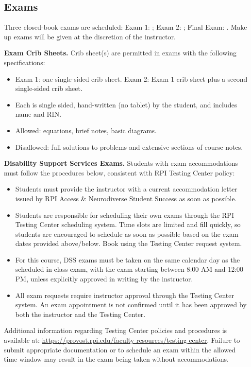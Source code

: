 \subsection*{Exams}
Three closed-book exams are scheduled: Exam 1: \ExamOneDate{}; Exam 2: \ExamTwoDate{}; Final Exam: \FinalExamStatus{}. Make up exams will be given at the discretion of the instructor.

\textbf{Exam Crib Sheets.} Crib sheet(s) are permitted in exams with the following specifications:
\begin{itemize}
\item Exam 1: one single-sided crib sheet. Exam 2: Exam 1 crib sheet plus a second single-sided crib sheet.
\item Each is single sided, hand-written (no tablet) by the student, and includes name and RIN.
\item Allowed: equations, brief notes, basic diagrams.
\item Disallowed: full solutions to problems and extensive sections of course notes.
\end{itemize}

\textbf{Disability Support Services Exams.} Students with exam accommodations must follow the procedures below, consistent with RPI Testing Center policy:
\begin{itemize}
\item Students must provide the instructor with a current accommodation letter issued by RPI Access \& Neurodiverse Student Success as soon as possible.
\item Students are responsible for scheduling their own exams through the RPI Testing Center scheduling system. Time slots are limited and fill quickly, so students are encouraged to schedule as soon as possible based on the exam dates provided above/below. Book using the Testing Center request system.
\item For this course, DSS exams must be taken on the same calendar day as the scheduled in-class exam, with the exam starting between 8:00 AM and 12:00 PM, unless explicitly approved in writing by the instructor.
\item All exam requests require instructor approval through the Testing Center system. An exam appointment is not confirmed until it has been approved by both the instructor and the Testing Center.
\end{itemize}
Additional information regarding Testing Center policies and procedures is available at: \url{https://provost.rpi.edu/faculty-resources/testing-center}. Failure to submit appropriate documentation or to schedule an exam within the allowed time window may result in the exam being taken without accommodations.
